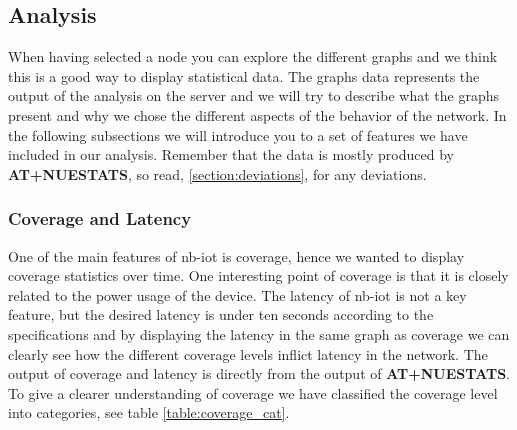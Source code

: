 \documentclass[USenglish]{ifimaster}  %
\begin{document}
\subsection{Analysis} \label{ssection:analysis}
When having selected a node you can explore the different graphs and we think this is a good way to display statistical data. The graphs data represents the output of the analysis on the server and we will try to describe what the graphs present and why we chose the different aspects of the behavior of the network.
In the following subsections we will introduce you to a set of features we have included in our analysis. Remember that the data is mostly produced by \textbf{AT+NUESTATS}, so read, \vref{section:deviations}, for any deviations.

\subsubsection{Coverage and Latency}
One of the main features of \acrshort{nb-iot} is coverage, hence we wanted to display coverage statistics over time. One interesting point of coverage is that it is closely related to the power usage of the device. The latency of \acrshort{nb-iot} is not a key feature, but the desired latency is under ten seconds according to the specifications\cite{datasheet:ubloxchip} and by displaying the latency in the same graph as coverage we can clearly see how the different coverage levels inflict latency in the network. The output of coverage and latency is directly from the output of \textbf{AT+NUESTATS}. To give a clearer understanding of coverage we have classified the coverage level into categories, see table \vref{table:coverage_cat}.

\begin{table}[H]
\centering
{}
\caption{Coverage categories}
\label{table:coverage_cat}
\end{table}
\end{document}
